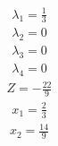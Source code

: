 \documentclass{article}
\begin{document}
\begin{align*}
\lambda_{1}=\frac{1}{3}\end{align*}
\begin{align*}
\lambda_{2}=0\end{align*}
\begin{align*}
\lambda_{3}=0\end{align*}
\begin{align*}
\lambda_{4}=0\end{align*}
\begin{align*}
Z=-\frac{22}{9}\end{align*}
\begin{align*}
x_{1}=\frac{2}{3}\end{align*}
\begin{align*}
x_{2}=\frac{14}{9}\end{align*}
\end{document}
